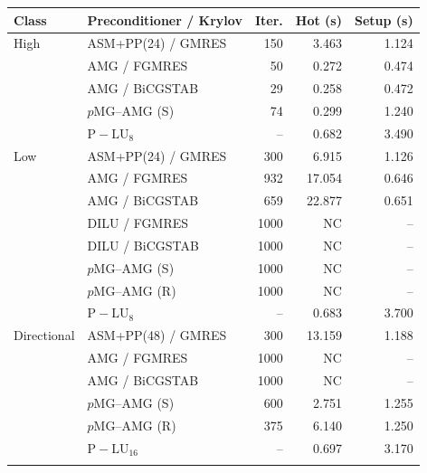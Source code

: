 \begin{tabular}{llrrr}
\toprule
Class & Preconditioner / Krylov & Iter. & Hot (s) & Setup (s) \\
\midrule
High & ASM+PP(24) / GMRES & 150 & 3.463 & 1.124 \\
 & AMG / FGMRES & 50 & 0.272 & 0.474 \\
 & AMG / BiCGSTAB & 29 & 0.258 & 0.472 \\
 & $p$MG--AMG (S) & 74 & 0.299 & 1.240 \\
 & $\mathrm{P\!-\!LU}_{8}$ & -- & 0.682 & 3.490 \\
\addlinespace[2pt]
Low & ASM+PP(24) / GMRES & 300 & 6.915 & 1.126 \\
 & AMG / FGMRES & 932 & 17.054 & 0.646 \\
 & AMG / BiCGSTAB & 659 & 22.877 & 0.651 \\
 & DILU / FGMRES & 1000 & NC & -- \\
 & DILU / BiCGSTAB & 1000 & NC & -- \\
 & $p$MG--AMG (S) & 1000 & NC & -- \\
 & $p$MG--AMG (R) & 1000 & NC & -- \\
 & $\mathrm{P\!-\!LU}_{8}$ & -- & 0.683 & 3.700 \\
\addlinespace[2pt]
Directional & ASM+PP(48) / GMRES & 300 & 13.159 & 1.188 \\
 & AMG / FGMRES & 1000 & NC & -- \\
 & AMG / BiCGSTAB & 1000 & NC & -- \\
 & $p$MG--AMG (S) & 600 & 2.751 & 1.255 \\
 & $p$MG--AMG (R) & 375 & 6.140 & 1.250 \\
 & $\mathrm{P\!-\!LU}_{16}$ & -- & 0.697 & 3.170 \\
\addlinespace[2pt]
\bottomrule
\end{tabular}
